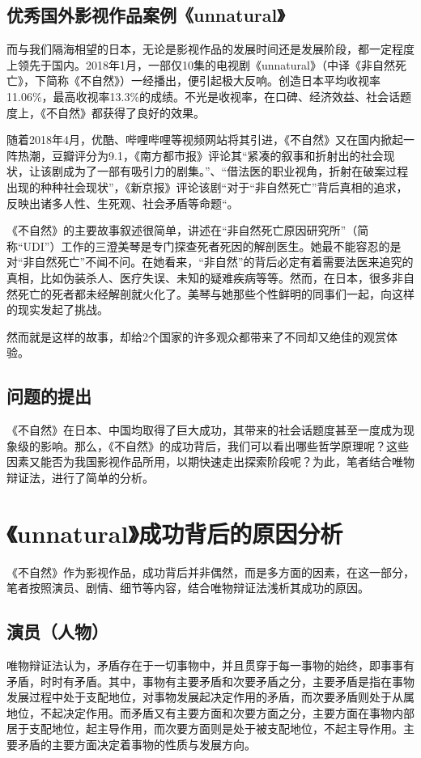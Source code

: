 \documentclass[12pt]{article}%
\begin{document}
\subsection{优秀国外影视作品案例《unnatural》}
而与我们隔海相望的日本，无论是影视作品的发展时间还是发展阶段，都一定程度上领先于国内。2018年1月，一部仅10集的电视剧《unnatural》（中译《非自然死亡》，下简称《不自然》）一经播出，便引起极大反响。创造日本平均收视率	11.06\%，最高收视率13.3\%的成绩。不光是收视率，在口碑、经济效益、社会话题度上，《不自然》都获得了良好的效果。

随着2018年4月，优酷、哔哩哔哩等视频网站将其引进，《不自然》又在国内掀起一阵热潮，豆瓣评分为9.1，《南方都市报》评论其“紧凑的叙事和折射出的社会现状，让该剧成为了一部有吸引力的剧集。”、“借法医的职业视角，折射在破案过程出现的种种社会现状”，《新京报》评论该剧“对于“非自然死亡”背后真相的追求，反映出诸多人性、生死观、社会矛盾等命题“。

《不自然》的主要故事叙述很简单，讲述在“非自然死亡原因研究所”（简称“UDI”）工作的三澄美琴是专门探查死者死因的解剖医生。她最不能容忍的是对“非自然死亡”不闻不问。在她看来，“非自然”的背后必定有着需要法医来追究的真相，比如伪装杀人、医疗失误、未知的疑难疾病等等。然而，在日本，很多非自然死亡的死者都未经解剖就火化了。美琴与她那些个性鲜明的同事们一起，向这样的现实发起了挑战。

然而就是这样的故事，却给2个国家的许多观众都带来了不同却又绝佳的观赏体验。
\subsection{问题的提出}

《不自然》在日本、中国均取得了巨大成功，其带来的社会话题度甚至一度成为现象级的影响。那么，《不自然》的成功背后，我们可以看出哪些哲学原理呢？这些因素又能否为我国影视作品所用，以期快速走出探索阶段呢？为此，笔者结合唯物辩证法，进行了简单的分析。


\section{《unnatural》成功背后的原因分析}
《不自然》作为影视作品，成功背后并非偶然，而是多方面的因素，在这一部分，笔者按照演员、剧情、细节等内容，结合唯物辩证法浅析其成功的原因。
\subsection{演员（人物）}
唯物辩证法认为，矛盾存在于一切事物中，并且贯穿于每一事物的始终，即事事有矛盾，时时有矛盾。其中，事物有主要矛盾和次要矛盾之分，主要矛盾是指在事物发展过程中处于支配地位，对事物发展起决定作用的矛盾，而次要矛盾则处于从属地位，不起决定作用。而矛盾又有主要方面和次要方面之分，主要方面在事物内部居于支配地位，起主导作用，而次要方面则是处于被支配地位，不起主导作用。主要矛盾的主要方面决定着事物的性质与发展方向。
\end{document}
